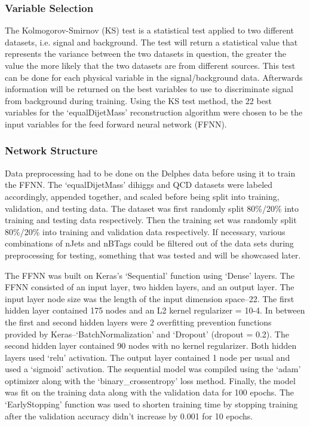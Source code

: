 \subsubsection{Variable Selection}
The Kolmogorov-Smirnov (KS) test is a statistical test applied to two different datasets, i.e. signal and background. The test will return a statistical value that represents the variance between the two datasets in question, the greater the value the more likely that the two datasets are from different sources. This test can be done for each physical variable in the signal/background data. Afterwards information will be returned on the best variables to use to discriminate signal from background during training. Using the KS test method, the 22 best variables for the ‘equalDijetMass’ reconstruction algorithm were chosen to be the input variables for the feed forward neural network (FFNN). 

\subsubsection{Network Structure}
Data preprocessing had to be done on the Delphes data before using it to train the FFNN. The ‘equalDijetMass’ dihiggs and QCD datasets were labeled accordingly, appended together, and scaled before being split into training, validation, and testing data. The dataset was first randomly split 80\%/20\% into training and testing data respectively. Then the training set was randomly split 80\%/20\% into training and validation data respectively. If necessary, various combinations of nJets and nBTags could be filtered out of the data sets during preprocessing for testing, something that was tested and will be showcased later.

The FFNN was built on Keras’s ‘Sequential’ function using ‘Dense’ layers. The FFNN consisted of an input layer, two hidden layers, and an output layer. The input layer node size was the length of the input dimension space--22. The first hidden layer contained 175 nodes and an L2 kernel regularizer = 10-4. In between the first and second hidden layers were 2 overfitting prevention functions provided by Keras--‘BatchNormalization’ and ‘Dropout’ (dropout = 0.2). The second hidden layer contained 90 nodes with no kernel regularizer. Both hidden layers used ‘relu’ activation. The output layer contained 1 node per usual and used a ‘sigmoid’ activation. The sequential model was compiled using the ‘adam’ optimizer along with the ‘binary\_crossentropy’ loss method. Finally, the model was fit on the training data along with the validation data for 100 epochs. The ‘EarlyStopping’ function was used to shorten training time by stopping training after the validation accuracy didn’t increase by 0.001 for 10 epochs. 

